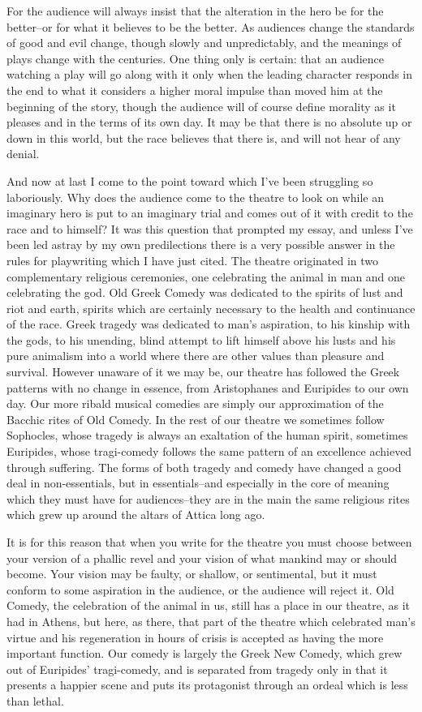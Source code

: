 \documentclass[9pt,twoside]{extarticle}
\begin{document}
For the audience will always insist that the alteration in the hero be for the better--or for what it believes to be the better. As audiences change the standards of good and evil change, though slowly and unpredictably, and the meanings of plays change with the centuries. One thing only is certain: that an audience watching a play will go along with it only when the leading character responds in the end to what it considers a higher moral impulse than moved him at the beginning of the story, though the audience will of course define morality as it pleases and in the terms of its own day. It may be that there is no absolute up or down in this world, but the race believes that there is, and will not hear of any denial.

And now at last I come to the point toward which I've been struggling so laboriously. Why does the audience come to the theatre to look on while an imaginary hero is put to an imaginary trial and comes out of it with credit to the race and to himself? It was this question that prompted my essay, and unless I've been led astray by my own predilections there is a very possible answer in the rules for playwriting which I have just cited. The theatre originated in two complementary religious ceremonies, one celebrating the animal in man and one celebrating the god. Old Greek Comedy was dedicated to the spirits of lust and riot and earth, spirits which are certainly necessary to the health and continuance of the race. Greek tragedy was dedicated to man's aspiration, to his kinship with the gods, to his unending, blind attempt to lift himself above his lusts and his pure animalism into a world where there are other values than pleasure and survival. However unaware of it we may be, our theatre has followed the Greek patterns with no change in essence, from Aristophanes and Euripides to our own day. Our more ribald musical comedies are simply our approximation of the Bacchic rites of Old Comedy. In the rest of our theatre we sometimes follow Sophocles, whose tragedy is always an exaltation of the human spirit, sometimes Euripides, whose tragi-comedy follows the same pattern of an excellence achieved through suffering. The forms of both tragedy and comedy have changed a good deal in non-essentials, but in essentials--and especially in the core of meaning which they must have for audiences--they are in the main the same religious rites which grew up around the altars of Attica long ago.

It is for this reason that when you write for the theatre you must choose between your version of a phallic revel and your vision of what mankind may or should become. Your vision may be faulty, or shallow, or sentimental, but it must conform to some aspiration in the audience, or the audience will reject it. Old Comedy, the celebration of the animal in us, still has a place in our theatre, as it had in Athens, but here, as there, that part of the theatre which celebrated man's virtue and his regeneration in hours of crisis is accepted as having the more important function. Our comedy is largely the Greek New Comedy, which grew out of Euripides' tragi-comedy, and is separated from tragedy only in that it presents a happier scene and puts its protagonist through an ordeal which is less than lethal.
\end{document}
